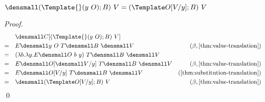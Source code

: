 \begin{lemma}
  \label{thm:template-self}
  
  $\den{(\Template{} (y ~ O); B) ~ V = (\Template O\subst{y}{V}; B) ~ V}$
\end{lemma}
\begin{proof}
  \begin{align*}
    &\quad
    \den{C[(\Template{} (y ~ O); B) ~ V]}
    \\
    =&\quad
    E\den{y ~ O} ~ T\den{B} ~ \den{V}
    &(\beta, \cref{thm:value-translation})
    \\
    =&\quad
    (\lambda b. \lambda y. E\den{O} ~ b ~ y) ~ T\den{B} ~ \den{V}
    \\
    =&\quad
    E\den{O}\subst{y}{\den{V}} ~ T\den{B} ~ \den{V}
    &(\beta, \cref{thm:value-translation})
    \\
    =&\quad
    E\den{O\subst{y}{V}} ~ T\den{B} ~ \den{V}
    &(\cref{thm:substitution-translation})
    \\
    =&\quad
    \den{(\Template O\subst{y}{V}; B) ~ V}
    &(\beta, \cref{thm:value-translation})
  \end{align*}
  \qed
\end{proof}

